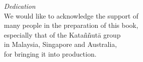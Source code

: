 
\cleartorecto
\thispagestyle{empty}

\vspace*{10mm}

{\centering
\small

\textit{Dedication}\\[0.4\baselineskip]
We would like to acknowledge the support of\\
many people in the preparation of this book,\\
especially that of the Kataññutā group\\
in Malaysia, Singapore and Australia,\\
for bringing it into production.

}

